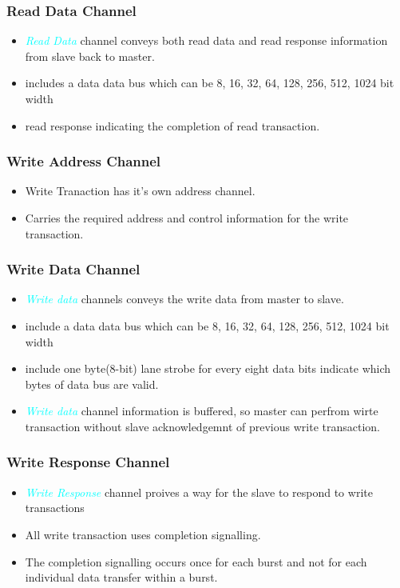 \documentclass{article}
\newcommand{\chFormat}[1]{\emph{\textcolor{cyan}{#1}}}
\begin{document}
\subsubsection{Read Data Channel}
\begin{itemize}
    \item \chFormat{Read Data} channel conveys both read data and read response information from slave back to master.
    \item includes a data data bus which can be 8, 16, 32, 64, 128, 256, 512, 1024 bit width
    \item read response indicating the completion of read transaction.
\end{itemize}

\subsubsection{Write Address Channel}
\begin{itemize}
    \item Write Tranaction has it's own address channel.
    \item Carries the required address and control information for the write transaction.
\end{itemize}

\subsubsection{Write Data Channel}
\begin{itemize}
    \item \chFormat{Write data} channels conveys the write data from master to slave.
    \item include a data data bus which can be 8, 16, 32, 64, 128, 256, 512, 1024 bit width
    \item include one byte(8-bit) lane strobe for every eight data bits indicate which bytes of data bus are valid.
    \item \chFormat{Write data} channel information is buffered, so master can perfrom wirte transaction without slave acknowledgemnt of previous write transaction.
\end{itemize}

\subsubsection{Write Response Channel}
\begin{itemize}
    \item \chFormat{Write Response} channel proives a way for the slave to respond to write transactions
    \item All write transaction uses completion signalling.
    \item The completion signalling occurs once for each burst and not for each individual data transfer within a burst.
\end{itemize}
\end{document}
